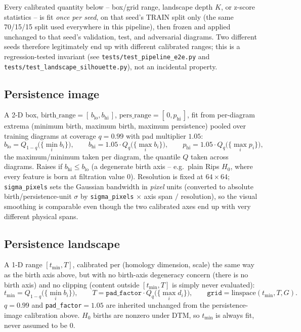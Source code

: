\documentclass[11pt]{article}
\begin{document}
Every calibrated quantity below -- box/grid range, landscape depth $K$, or
z-score statistics -- is fit \emph{once per seed}, on that seed's TRAIN split only
(the same 70/15/15 split used everywhere in this pipeline), then frozen and applied
unchanged to that seed's validation, test, and adversarial diagrams. Two different
seeds therefore legitimately end up with different calibrated ranges; this is a
regression-tested invariant (see \texttt{tests/test\_pipeline\_e2e.py} and
\texttt{tests/test\_landscape\_silhouette.py}), not an incidental property.

\subsection{Persistence image}
A 2-D box, $\text{birth\_range}=[\,b_{\mathrm{lo}}, b_{\mathrm{hi}}\,]$,
$\text{pers\_range}=[\,0, p_{\mathrm{hi}}\,]$, fit from per-diagram extrema (minimum
birth, maximum birth, maximum persistence) pooled over training diagrams at coverage
$q=0.99$ with pad multiplier $1.05$:
\[
  b_{\mathrm{lo}} = Q_{1-q}\bigl(\{\min_i b_i\}\bigr), \qquad
  b_{\mathrm{hi}} = 1.05\cdot Q_{q}\bigl(\{\max_i b_i\}\bigr), \qquad
  p_{\mathrm{hi}} = 1.05\cdot Q_{q}\bigl(\{\max_i p_i\}\bigr),
\]
the maximum/minimum taken per diagram, the quantile $Q$ taken across diagrams. Raises
if $b_{\mathrm{hi}} \le b_{\mathrm{lo}}$ (a degenerate birth axis -- e.g.\ plain Rips
$H_0$, where every feature is born at filtration value $0$). Resolution is fixed at
$64\times64$; \texttt{sigma\_pixels} sets the Gaussian bandwidth in \emph{pixel} units
(converted to absolute birth/persistence-unit $\sigma$ by \texttt{sigma\_pixels}
$\times$ axis span $/$ resolution), so the visual smoothing is comparable even though
the two calibrated axes end up with very different physical spans.

\subsection{Persistence landscape}
A 1-D range $[t_{\min}, T]$, calibrated per (homology dimension, scale) the same way
as the birth axis above, but with no birth-axis degeneracy concern (there is no birth
axis) and no clipping (content outside $[t_{\min},T]$ is simply never evaluated):
\[
  t_{\min} = Q_{1-q}\bigl(\{\min_i b_i\}\bigr), \qquad
  T = \texttt{pad\_factor}\cdot Q_{q}\bigl(\{\max_i d_i\}\bigr), \qquad
  \texttt{grid} = \mathrm{linspace}(t_{\min}, T, G).
\]
$q=0.99$ and \texttt{pad\_factor}$=1.05$ are inherited unchanged from the
persistence-image calibration above. $H_0$ births are nonzero under DTM, so
$t_{\min}$ is always fit, never assumed to be $0$.
\end{document}
